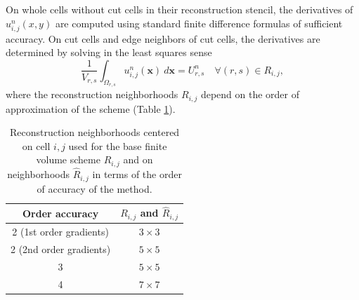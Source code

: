 On whole cells without cut cells in their reconstruction stencil, the derivatives of $u^n_{i,j}(x,y)$ are computed using standard finite difference formulas of sufficient accuracy.
On cut cells and edge neighbors of cut cells, the derivatives are determined by solving in the least squares sense
\begin{equation}\label{eq:ls_base}
\frac{1}{V_{r,s}}\int_{\Omega_{r,s}} u^n_{i,j}(\mathbf{x})~d\mathbf{x} = U^n_{r,s} \quad \forall (r,s) \in R_{i,j},
\end{equation}
where the reconstruction neighborhoods $R_{i,j}$ depend on the order of approximation of the scheme (Table \ref{tab:reconneigh}).
\begin{table}
	\centering
	\begin{tabular}{|c|c|}
		\hline 
		Order accuracy & $R_{i,j}$ and $\hat R_{i,j}$ \\
		\hline
		2 (1st order gradients) &  $3 \times 3 $ \\
		\hline
		2 (2nd order gradients) &  $5 \times 5 $ \\
		\hline
		3 & $5 \times 5$ \\
		\hline
		4 & $7 \times 7$ \\
		\hline
	\end{tabular} 
	\caption{Reconstruction neighborhoods centered on cell $i,j$ used for the base finite volume scheme $R_{i,j}$ and on neighborhoods $\widehat{R}_{i,j}$ in terms of the 
        order of accuracy of the method.   
} \label{tab:reconneigh}
\end{table}

